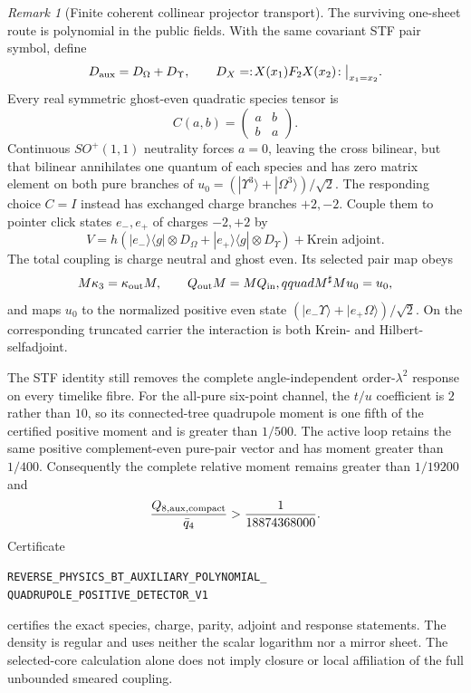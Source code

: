 \documentclass[11pt]{article}
\theoremstyle{definition}
\theoremstyle{remark}
\newtheorem{remark}[theorem]{Remark}
\begin{document}
\begin{remark}[Finite coherent collinear projector transport]
The surviving one-sheet route is polynomial in the public fields.  With the
same covariant STF pair symbol, define
\[
 D_{\rm aux}=D_\Omega+D_\Upsilon,
 \qquad D_X=:\!X(x_1)F_2X(x_2)\!:\big|_{x_1=x_2}.
\]
Every real symmetric ghost-even quadratic species tensor is
\[
 C(a,b)=\begin{pmatrix}a&b\\b&a\end{pmatrix}.
\]
Continuous $SO^+(1,1)$ neutrality forces $a=0$, leaving the cross bilinear,
but that bilinear annihilates one quantum of each species and has zero matrix
element on both pure branches of
$u_0=(|\Upsilon^3\rangle+|\Omega^3\rangle)/\sqrt2$.  The responding choice
$C=I$ instead has exchanged charge branches $+2,-2$.  Couple them to pointer
click states $e_-,e_+$ of charges $-2,+2$ by
\[
 V=h\left(|e_-\rangle\langle g|\otimes D_\Omega
          +|e_+\rangle\langle g|\otimes D_\Upsilon\right)
   +\text{Krein adjoint}.
\]
The total coupling is charge neutral and ghost even.  Its selected pair map
obeys
\[
 M\kappa_3=\kappa_{\rm out}M,\qquad
 Q_{\rm out}M=MQ_{\rm in},qquad
 M^\sharp M u_0=u_0,
\]
and maps $u_0$ to the normalized positive even state
$(|e_-\Upsilon\rangle+|e_+\Omega\rangle)/\sqrt2$.  On the corresponding
truncated carrier the interaction is both Krein- and Hilbert-selfadjoint.

The STF identity still removes the complete angle-independent
order-$\lambda^2$ response on every timelike fibre.  For the all-pure
six-point channel, the $t/u$ coefficient is $2$ rather than $10$, so its
connected-tree quadrupole moment is one fifth of the certified positive
moment and is greater than $1/500$.  The active loop retains the same positive
complement-even pure-pair vector and has moment greater than $1/400$.
Consequently the complete relative moment remains greater than $1/19200$ and
\[
 \frac{Q_{8,{\rm aux},\rm compact}}{\bar q_4}
 >\frac{1}{18874368000}.
\]
Certificate
\par\noindent
\texttt{REVERSE\_PHYSICS\_BT\_AUXILIARY\_POLYNOMIAL\_}
\allowbreak\texttt{QUADRUPOLE\_POSITIVE\_DETECTOR\_V1}
\par\noindent
certifies the exact species, charge, parity, adjoint and response statements.
The density is regular and uses neither the scalar logarithm nor a mirror
sheet.  The selected-core calculation alone does not imply closure or local
affiliation of the full unbounded smeared coupling.


\end{remark}
\end{document}
